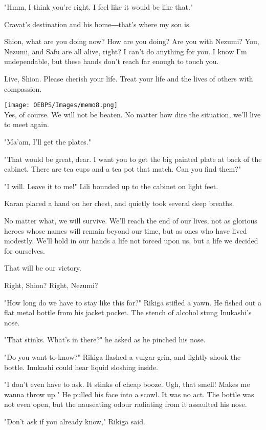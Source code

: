 "Hmm, I think you're right. I feel like it would be like that."

Cravat's destination and his home―that's where my son is.

Shion, what are you doing now? How are you doing? Are you with Nezumi?
You, Nezumi, and Safu are all alive, right? I can't do anything for you.
I know I'm undependable, but these hands don't reach far enough to touch
you.

Live, Shion. Please cherish your life. Treat your life and the lives of
others with compassion.

\texttt{[image: OEBPS/Images/memo8.png]}\\

Yes, of course. We will not be beaten. No matter how dire the situation,
we'll live to meet again.

"Ma'am, I'll get the plates."

"That would be great, dear. I want you to get the big painted plate at
back of the cabinet. There are tea cups and a tea pot that match. Can
you find them?"

"I will. Leave it to me!" Lili bounded up to the cabinet on light feet.~

Karan placed a hand on her chest, and quietly took several deep breaths.

No matter what, we will survive. We'll reach the end of our lives, not
as glorious heroes whose names will remain beyond our time, but as ones
who have lived modestly. We'll hold in our hands a life not forced upon
us, but a life we decided for ourselves.

That will be our victory.

Right, Shion? Right, Nezumi?

"How long do we have to stay like this for?" Rikiga stifled a yawn. He
fished out a flat metal bottle from his jacket pocket. The stench of
alcohol stung Inukashi's nose.

"That stinks. What's in there?" he asked as he pinched his nose.

"Do you want to know?" Rikiga flashed a vulgar grin, and lightly shook
the bottle. Inukashi could hear liquid sloshing inside.

"I don't even have to ask. It stinks of cheap booze. Ugh, that smell!
Makes me wanna throw up." He pulled his face into a scowl. It was no
act. The bottle was not even open, but the nauseating odour radiating
from it assaulted his nose.

"Don't ask if you already know," Rikiga said.

